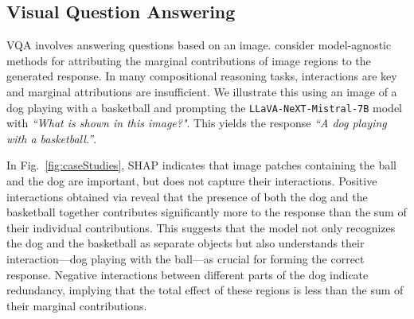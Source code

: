 


\subsection{Visual Question Answering}

VQA involves answering questions based on an image. \citet{ petsiuk2018, frank2021, parcalabescu2023} consider model-agnostic methods for attributing the marginal contributions of image regions to the generated response. 
In many compositional reasoning tasks, interactions are key and marginal attributions are insufficient. We illustrate this using an image of a dog playing with a basketball and prompting the \texttt{LLaVA-NeXT-Mistral-7B} model \citep{liu2023} with \emph{``What is shown in this image?"}. This yields the response \emph{``A dog playing with a basketball.''}. 

In Fig.~\ref{fig:caseStudies}, SHAP indicates that image patches containing the ball and the dog are important, but does not capture their interactions. Positive interactions obtained via \SpecExp{} reveal that the presence of both the dog and the basketball together contributes significantly more to the response than the sum of their individual contributions. This suggests that the model not only recognizes the dog and the basketball as separate objects but also understands their interaction---dog playing with the ball---as crucial for forming the correct response. Negative interactions between different parts of the dog indicate redundancy, implying that the total effect of these regions is less than the sum of their marginal contributions.

    
